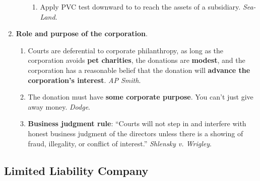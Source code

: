 \begin{enumerate}
\begin{enumerate}
\begin{enumerate}
            \item Apply PVC test downward to to reach the assets of a 
            subsidiary. \emph{Sea-Land}. %
            
        \end{enumerate}
    \end{enumerate}
    \item \textbf{Role and purpose of the corporation}.
    \begin{enumerate}
        \item Courts are deferential to corporate philanthropy, as long as the 
        corporation avoids \textbf{pet charities}, the donations are 
        \textbf{modest}, and the corporation has a reasonable belief that the 
        donation will \textbf{advance the corporation's interest}. \emph{AP 
        Smith}. %
        \item The donation must have \textbf{some corporate purpose}. You 
        can't just give away money. \emph{Dodge}. %
        \item \textbf{Business judgment rule}: ``Courts will not step 
        in and interfere with honest business judgment of the directors unless 
        there is a showing of fraud, illegality, or conflict of interest.'' 
        \emph{Shlensky v. Wrigley}. %
    \end{enumerate}
\end{enumerate}

\newpage

\subsection{Limited Liability Company}

